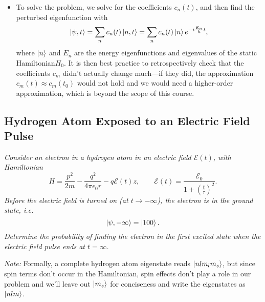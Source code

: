 \documentclass[11pt, a4paper]{article}
\newcommand{\Ham}{Hamiltonian\xspace}
\newcommand{\p}{\psi}  %
\newcommand{\E}{\mathcal{E}}  %
\begin{document}
\begin{itemize}
	\item To solve the problem, we solve for the coefficients $ c_{n}(t) $, and then find the perturbed eigenfunction with
	\begin{equation*}
		\ket{\p, t} = \sum_{n}c_{n}(t)\ket{n, t} = \sum_{n}c_{n}(t) \ket{n}e^{-i\frac{E_{n}}{\hbar}t},
	\end{equation*}
	where $ \ket{n} $ and $ E_{n} $ are the energy eigenfunctions and eigenvalues of the static \Ham $ H_{0} $. It is then best practice to retrospectively check that the coefficients $ c_{m} $ didn't actually change much---if they did, the approximation $ c_{m}(t) \approx c_{m}(t_{0}) $ would not hold and we would need a higher-order approximation, which is beyond the scope of this course.
	
\end{itemize}

\subsection{Hydrogen Atom Exposed to an Electric Field Pulse}
\textit{Consider an electron in a hydrogen atom in an electric field $ \E(t) $, with \Ham}
\begin{equation*}
	H = \frac{p^{2}}{2m} - \frac{q^{2}}{4 \pi \epsilon_{0} r} - q \E(t)z, \qquad \E(t) = \frac{\E_{0}}{1 + \left(\frac{t}{\tau}\right)^{2}}.
\end{equation*}
\textit{Before the electric field is turned on (at $ t \to - \infty $), the electron is in the ground state, i.e.}
\begin{equation*}
	\ket{\p, - \infty} = \ket{100}.
\end{equation*}
\textit{Determine the probability of finding the electron in the first excited state when the electric field pulse ends at $ t = \infty $}.

\vspace{2mm}
\textit{Note:} Formally, a complete hydrogen atom eigenstate reads $ \ket{nlm_{l}m_{s}} $, but since spin terms don't occur in the \Ham, spin effects don't play a role in our problem and we'll leave out $ \ket{m_{s}} $ for conciseness and write the eigenstates as $ \ket{nlm} $.
	
\end{document}
